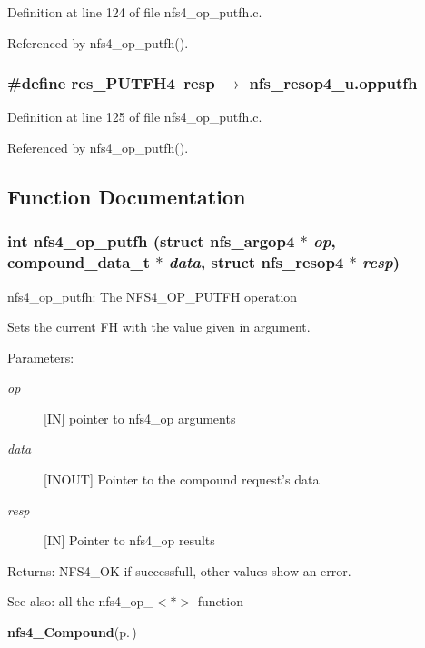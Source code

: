 Definition at line 124 of file nfs4\_\-op\_\-putfh.c.

Referenced by nfs4\_\-op\_\-putfh().
\subsubsection{\setlength{\rightskip}{0pt plus 5cm}\#define res\_\-PUTFH4\ resp $\rightarrow$ nfs\_\-resop4\_\-u.opputfh}\label{nfs4__op__putfh_8c_a1}




Definition at line 125 of file nfs4\_\-op\_\-putfh.c.

Referenced by nfs4\_\-op\_\-putfh().

\subsection{Function Documentation}
\subsubsection{\setlength{\rightskip}{0pt plus 5cm}int nfs4\_\-op\_\-putfh (struct nfs\_\-argop4 $\ast$ {\em op}, compound\_\-data\_\-t $\ast$ {\em data}, struct nfs\_\-resop4 $\ast$ {\em resp})}\label{nfs4__op__putfh_8c_a2}


nfs4\_\-op\_\-putfh: The NFS4\_\-OP\_\-PUTFH operation

Sets the current FH with the value given in argument.

\begin{Desc}
\item[Parameters:]
\begin{description}
\item[{\em op}][IN] pointer to nfs4\_\-op arguments \item[{\em data}][INOUT] Pointer to the compound request's data \item[{\em resp}][IN] Pointer to nfs4\_\-op results\end{description}
\end{Desc}
\begin{Desc}
\item[Returns:]NFS4\_\-OK if successfull, other values show an error.\end{Desc}
\begin{Desc}
\item[See also:]all the nfs4\_\-op\_\-$<$$\ast$$>$ function 

{\bf nfs4\_\-Compound}{\rm (p.\,\pageref{nfs4__Compound_8c_a4})} \end{Desc}


